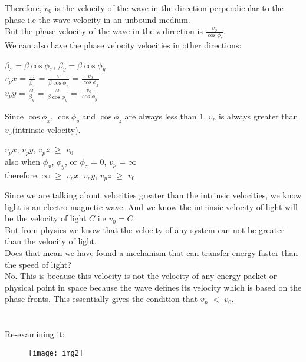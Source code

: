 Therefore, $v_0$ is the velocity of the wave in the direction perpendicular to the phase i.e the wave velocity in an unbound medium.
\\
But the phase velocity of the wave in the z-direction is $\frac{v_0}{\cos\phi_{z}}$.
\\
We can also have the phase velocity velocities in other directions:
\begin{center}
	$\beta_x = \beta\cos\phi_{x}$, $\beta_y = \beta\cos\phi_{y}$\\
	$v_px$ = $\frac{\omega}{\beta_x}$ = $\frac{\omega}{\beta\cos\phi_{x}}$ = $\frac{v_0}{\cos\phi_{x}}$\\
	$v_py$ = $\frac{\omega}{\beta_y}$ = $\frac{\omega}{\beta\cos\phi_{y}}$ = $\frac{v_0}{\cos\phi_{y}}$
\end{center}
Since $\cos\phi_{x}$, $\cos\phi_{y}$ and $\cos\phi_{z}$ are always less than 1, $v_p$ is always greater than $v_0$(intrinsic velocity).
\begin{center}
	$v_px$, $v_py$, $v_pz$ $\geq$ $v_0$\\
	also when $\phi_{x}$, $\phi_{y}$, or $\phi_{z}$ = 0, $v_p$ = $\infty$\\
	therefore, $\infty$ $\geq$ $v_px$, $v_py$, $v_pz$ $\geq$ $v_0$
\end{center}
Since we are talking about velocities greater than the intrinsic velocities, we know light is an electro-magnetic wave. And we know the intrinsic velocity of light will be the velocity of light $C$ i.e $v_0 = C$.\\
But from physics we know that the velocity of any system can not be greater than the velocity of light.\\
Does that mean we have found a mechanism that can transfer energy faster than the speed of light?\\
No. This is because this velocity is not the velocity of any energy packet or physical point in space because the wave defines its velocity which is based on the phase fronts. This essentially gives the condition that $v_p$ $<$ $v_0$.\\\\\\
Re-examining it:
\begin{figure}
	\centering
	\texttt{[image: img2]}
	\caption{}
\end{figure}
